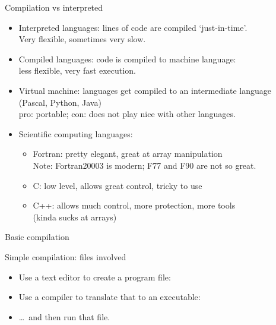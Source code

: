 \documentclass[11pt,headernav]{beamer}
\begin{document}
\begin{numberedframe}{Compilation vs interpreted}
  \begin{itemize}
  \item Interpreted languages: lines of code are compiled `just-in-time'.\\
    Very flexible, sometimes very slow.
  \item Compiled languages: code is compiled to machine language:\\
    less flexible, very fast execution.
  \item Virtual machine: languages get compiled to an intermediate language\\
    (Pascal, Python, Java)\\
    pro: portable; con: does not play nice with other languages.
  \item Scientific computing languages:
    \begin{itemize}
    \item Fortran: pretty elegant, great at array manipulation\\
      Note: Fortran20003 is modern; F77 and F90 are not so great.
    \item C: low level, allows great control, tricky to use
    \item C++: allows much control, more protection, more tools\\
      (kinda sucks at arrays)
    \end{itemize}
  \end{itemize}
\end{numberedframe}

 {Basic compilation}

\begin{numberedframe}{Simple compilation: files involved}
  \begin{itemize}
  \item Use a text editor to create a program file: 
  \item Use a compiler to translate that to an executable: 
  \item \ldots~and then run that file.
  \end{itemize}
\end{numberedframe}
\end{document}
